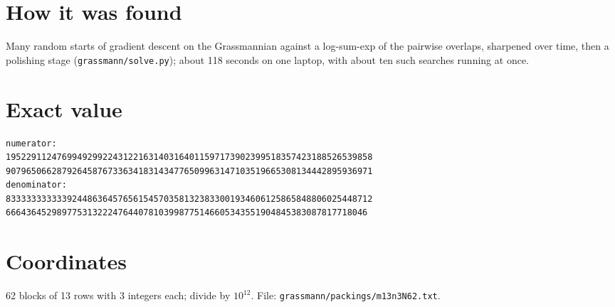 \documentclass[11pt,a4paper]{article}
\begin{document}
\section{How it was found}
Many random starts of gradient descent on the Grassmannian against a log-sum-exp of the pairwise overlaps, sharpened over time, then a polishing stage (\texttt{grassmann/solve.py}); about 118 seconds on one laptop, with about ten such searches running at once.


\appendix
\section{Exact value}
{\small
\begin{verbatim}
numerator:
195229112476994929922431221631403164011597173902399518357423188526539858
907965066287926458767336341831434776509963147103519665308134442895936971
denominator:
833333333333924486364576561545703581323833001934606125865848806025448712
66643645298977531322247644078103998775146605343551904845383087817718046
\end{verbatim}}

\section{Coordinates}
62 blocks of 13 rows with 3 integers each; divide by $10^{12}$. File: \texttt{grassmann/packings/m13n3N62.txt}.
{\tiny
\begin{multicols}{3}
\end{multicols}}
\end{document}
